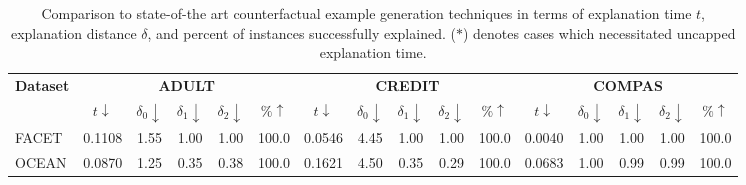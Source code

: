 \begin{table*}[t]
\small
\centering
\begin{tabularx}{0.95\textwidth}{|X|ccccc|ccccc|ccccc|}
\hline\textbf{Dataset} & \multicolumn{5}{c|}{\textbf{ADULT}} & \multicolumn{5}{c|}{\textbf{CREDIT}} & \multicolumn{5}{c|}{\textbf{COMPAS}} \\
& $t\downarrow$ & $\delta_0\downarrow$ & $\delta_1\downarrow$ & $\delta_2\downarrow$ & $\%\uparrow$ & $t\downarrow$ & $\delta_0\downarrow$ & $\delta_1\downarrow$ & $\delta_2\downarrow$ & $\%\uparrow$ & $t\downarrow$ & $\delta_0\downarrow$ & $\delta_1\downarrow$ & $\delta_2\downarrow$ & $\%\uparrow$ \\
\hline
FACET & 0.1108 & 1.55 & 1.00 & 1.00 & 100.0 & 0.0546 & 4.45 & 1.00 & 1.00 & 100.0 & 0.0040 & 1.00 & 1.00 & 1.00 & 100.0 \\
OCEAN & 0.0870 & 1.25 & 0.35 & 0.38 & 100.0 & 0.1621 & 4.50 & 0.35 & 0.29 & 100.0 & 0.0683 & 1.00 & 0.99 & 0.99 & 100.0 \\
\hline
\end{tabularx}
\caption{Comparison to state-of-the art counterfactual example generation techniques in terms of explanation time $t$, explanation distance $\delta$, and percent of instances successfully explained. ($\ast$) denotes cases which necessitated uncapped explanation time.}
\label{tab.compare_methods}
\vspace{-7mm}
\end{table*}
